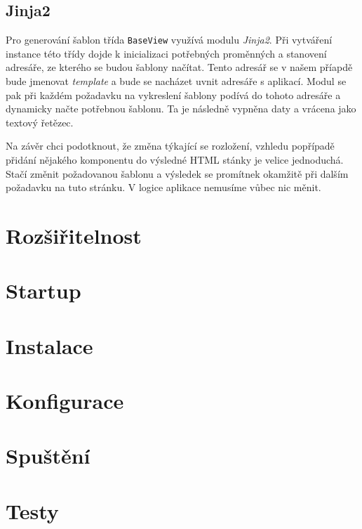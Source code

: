     \subsection{Jinja2}
    Pro generování šablon třída \verb|BaseView| využívá modulu \emph{Jinja2}. Při vytváření instance této třídy dojde k inicializaci potřebných proměnných a stanovení adresáře, ze kterého se budou šablony načítat. Tento adresář se v našem příapdě bude jmenovat \emph{template} a bude se nacházet uvnit adresáře s aplikací. Modul se pak při každém požadavku na vykreslení šablony podívá do tohoto adresáře a dynamicky načte potřebnou šablonu. Ta je následně vypněna daty a vrácena jako textový řetězec.

    Na závěr chci podotknout, že změna týkající se rozložení, vzhledu popřípadě přidání nějakého komponentu do výsledné HTML stánky je velice jednoduchá. Stačí změnit požadovanou šablonu a výsledek se promítnek okamžitě při dalším požadavku na tuto stránku. V logice aplikace nemusíme vůbec nic měnit.
\section{Rozšiřitelnost}



\section{Startup}
\section{Instalace}
\section{Konfigurace}
\section{Spuštění}
\section{Testy}

